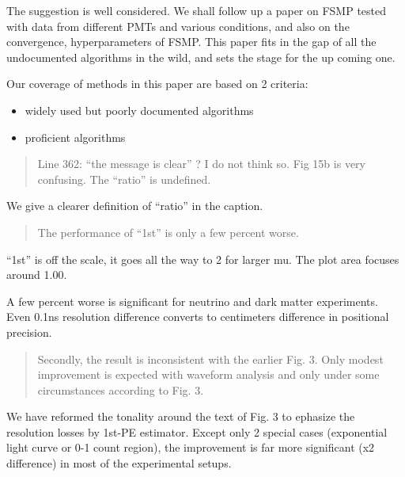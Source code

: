 \documentclass[12pt]{article}
\begin{document}
The suggestion is well considered.  We shall follow up a paper on FSMP tested with data from different PMTs and various conditions, and also on the convergence, hyperparameters of FSMP.  This paper fits in the gap of all the undocumented algorithms in the wild, and sets the stage for the up coming one.

Our coverage of methods in this paper are based on 2 criteria:

\begin{itemize}
    \item widely used but poorly documented algorithms
    \item proficient algorithms
\end{itemize}

\begin{quote}
Line 362: ``the message is clear'' ? I do not think so. Fig 15b is very confusing. The ``ratio'' is undefined. 
\end{quote}

We give a clearer definition of ``ratio'' in the caption.

\begin{quote}
The performance of ``1st'' is only a few percent worse. 
\end{quote}

``1st'' is off the scale, it goes all the way to 2 for larger mu.  The plot area focuses around 1.00.

A few percent worse is significant for neutrino and dark matter experiments.  Even 0.1ns resolution difference converts to centimeters difference in positional precision.

\begin{quote}
Secondly, the result is inconsistent with the earlier Fig. 3. Only modest improvement is expected with waveform analysis and only under some circumstances according to Fig. 3.
\end{quote}

We have reformed the tonality around the text of Fig. 3 to ephasize the resolution losses by 1st-PE estimator.  Except only 2 special cases (exponential light curve or 0-1 count region), the improvement is far more significant (x2 difference) in most of the experimental setups.
\end{document}
